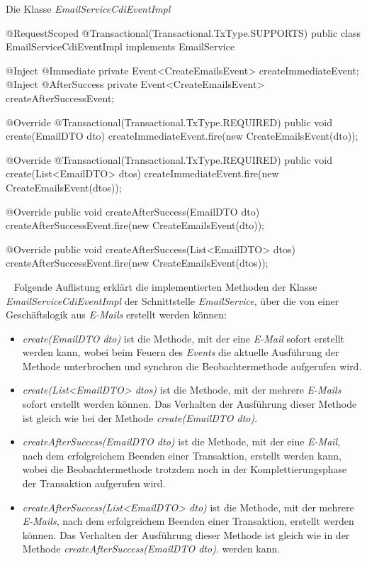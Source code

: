\begin{program}
\caption{Die Klasse \emph{EmailServiceCdiEventImpl}}
\label{prog:emailServiceCdiEventImpl}
\begin{JavaCode}
@RequestScoped
@Transactional(Transactional.TxType.SUPPORTS)
public class EmailServiceCdiEventImpl implements EmailService {
    @Inject
    @Immediate
    private Event<CreateEmailsEvent> createImmediateEvent;
    @Inject
    @AfterSuccess
    private Event<CreateEmailsEvent> createAfterSuccessEvent;

    @Override
    @Transactional(Transactional.TxType.REQUIRED)
    public void create(EmailDTO dto) {
        createImmediateEvent.fire(new CreateEmailsEvent(dto));
    }

    @Override
    @Transactional(Transactional.TxType.REQUIRED)
    public void create(List<EmailDTO> dtos) {
        createImmediateEvent.fire(new CreateEmailsEvent(dtos));
    }

    @Override
    public void createAfterSuccess(EmailDTO dto) {
        createAfterSuccessEvent.fire(new CreateEmailsEvent(dto));
    }

    @Override
    public void createAfterSuccess(List<EmailDTO> dtos) {
        createAfterSuccessEvent.fire(new CreateEmailsEvent(dtos));
    }
}
\end{JavaCode}
\end{program}
\ \newline
Folgende Auflistung erklärt die implementierten Methoden der Klasse \emph{EmailServiceCdiEventImpl} der Schnittstelle \emph{EmailService}, über die von einer Geschäftslogik aus \emph{E-Mails} erstellt werden können:
\begin{itemize}
	\item\emph{create(EmailDTO dto)}
	\newline
	ist die Methode, mit der eine \emph{E-Mail} sofort erstellt werden kann, wobei beim Feuern des \emph{Events} die aktuelle Ausführung der Methode unterbrochen und synchron die Beobachtermethode aufgerufen wird.
	\item\emph{create(List<EmailDTO> dtos)}
	\newline
	ist die Methode, mit der mehrere \emph{E-Mails} sofort erstellt werden können. Das Verhalten der Ausführung dieser Methode ist gleich wie bei der Methode \emph{create(EmailDTO dto)}.
	\item\emph{createAfterSuccess(EmailDTO dto)}
	\newline
	ist die Methode, mit der eine \emph{E-Mail}, nach dem erfolgreichem Beenden einer Transaktion, erstellt werden kann, wobei die Beobachtermethode trotzdem noch in der Komplettierungsphase der Transaktion aufgerufen wird.
	\item\emph{createAfterSuccess(List<EmailDTO> dto)}
	\newline
	ist die Methode, mit der mehrere \emph{E-Mails}, nach dem erfolgreichem Beenden einer Transaktion, erstellt werden können. Das Verhalten der Ausführung dieser Methode ist gleich wie in der Methode \emph{createAfterSuccess(EmailDTO dto)}.
 werden kann.    
\end{itemize} 
